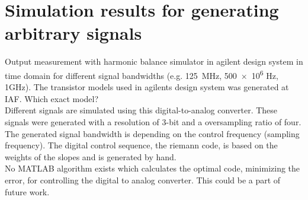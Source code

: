 \chapter{Simulation results for generating arbitrary signals}
Output measurement with harmonic balance simulator in agilent design system in time domain for different signal bandwidths (e.g. \SI{125}{\MHz}, \num{500e6} Hz, 1GHz). The transistor models used in agilents design system was generated at IAF. Which exact model?\\
Different signals are simulated using this digital-to-analog converter. These signals were generated with a resolution of 3-bit and a oversampling ratio of four. The generated signal bandwidth is depending on the control frequency (sampling frequency).
 The digital control sequence, the riemann code, is based on the weights of the slopes and is generated by hand.\\
No MATLAB algorithm exists which calculates the optimal code, minimizing the error, for controlling the digital to analog converter. This could be a part of future work.

